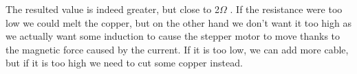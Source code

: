 \documentclass{../../myassignment}
\newcommand{\ohm}{$\Omega$ }
\begin{document}
	\begin{answer}
		The resulted value is indeed greater, but close to 2\ohm. If the resistance were too low we could melt the copper, but on the other hand we don't want it too high as we actually want some induction to cause the stepper motor to move thanks to the magnetic force caused by the current. If it is too low, we can add more cable, but if it is too high we need to cut some copper instead.

	\end{answer}
\end{document}
